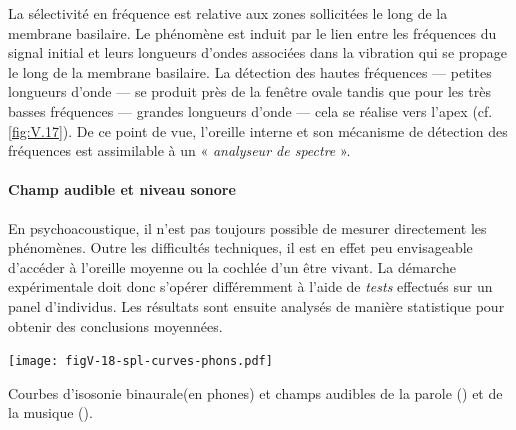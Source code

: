 La sélectivité en fréquence est relative aux zones sollicitées le long de la membrane basilaire. Le phénomène est induit par le lien entre les fréquences du signal initial et leurs longueurs d'ondes associées dans la vibration qui se propage le long de la membrane basilaire.
La détection des hautes fréquences --- petites longueurs d'onde --- se produit près de la fenêtre ovale tandis que pour les très basses fréquences --- grandes longueurs d'onde --- cela se réalise vers l'apex (cf. \cref{fig:V.17}). De ce point de vue, l'oreille interne et son mécanisme de détection des fréquences est assimilable
à un « \emph{analyseur de spectre} ».

\paragraph{Champ audible et niveau sonore} En psychoacoustique, il n'est pas toujours possible de mesurer directement les phénomènes. Outre les difficultés techniques, il est en effet peu envisageable d'accéder à l'oreille moyenne ou la cochlée d'un être vivant. La démarche expérimentale doit donc s'opérer différemment à l'aide de \emph{tests} effectués sur un panel d'individus. Les résultats sont ensuite analysés de manière statistique pour obtenir des conclusions moyennées.%



\begin{marginfigure}%
\texttt{[image: figV-18-spl-curves-phons.pdf]}
\caption{\label{fig:V.18}Courbes d'isosonie  binaurale(en phones) et champs audibles de la parole (\textcolor{secondcolor}{\textemdash}) et de la musique (\textcolor{firstcolor}{\textemdash}).}
\end{marginfigure}

